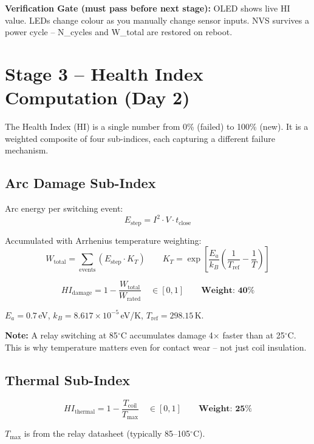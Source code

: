 \documentclass[12pt,a4paper]{article}
\newenvironment{notebox}{%
  \begin{mdframed}[backgroundcolor=notebg,linecolor=noteln,linewidth=1.5pt,
    innerleftmargin=9pt,innerrightmargin=9pt,innertopmargin=5pt,innerbottommargin=5pt]
  \textbf{\color{noteln}Note: }}{\end{mdframed}}
\newenvironment{checkgate}{%
  \begin{mdframed}[backgroundcolor=yellow!10,linecolor=orange!70,linewidth=1.5pt,
    innerleftmargin=9pt,innerrightmargin=9pt,innertopmargin=5pt,innerbottommargin=5pt]
  \textbf{\color{orange!70!black}Verification Gate (must pass before next stage): }}{\end{mdframed}}
\begin{document}
\begin{checkgate}
OLED shows live HI value. LEDs change colour as you manually change sensor inputs. NVS survives a power
cycle -- N\_cycles and W\_total are restored on reboot.
\end{checkgate}

\section{Stage 3 -- Health Index Computation (Day 2)}

The Health Index (HI) is a single number from 0\% (failed) to 100\% (new). It is a weighted composite of
four sub-indices, each capturing a different failure mechanism.

\subsection{Arc Damage Sub-Index}

Arc energy per switching event:
\[
E_{\text{step}} = I^2 \cdot V \cdot t_{\text{close}}
\]

Accumulated with Arrhenius temperature weighting:
\[
W_{\text{total}} = \sum_{\text{events}} \left(E_{\text{step}} \cdot K_T\right)
\qquad
K_T = \exp\!\left[\frac{E_a}{k_B}\!\left(\frac{1}{T_{\text{ref}}} - \frac{1}{T}\right)\right]
\]

\[
HI_{\text{damage}} = 1 - \frac{W_{\text{total}}}{W_{\text{rated}}}
\quad\in[0,1]
\qquad \textbf{Weight: 40\%}
\]

$E_a = 0.7$\,eV, $k_B = 8.617\times10^{-5}$\,eV/K, $T_{\text{ref}} = 298.15$\,K.

\begin{notebox}
A relay switching at 85$^\circ$C accumulates damage 4$\times$ faster than at 25$^\circ$C. This is why
temperature matters even for contact wear -- not just coil insulation.
\end{notebox}

\subsection{Thermal Sub-Index}

\[
HI_{\text{thermal}} = 1 - \frac{T_{\text{coil}}}{T_{\text{max}}}
\quad\in[0,1]
\qquad \textbf{Weight: 25\%}
\]

$T_{\text{max}}$ is from the relay datasheet (typically 85--105$^\circ$C).
\end{document}
